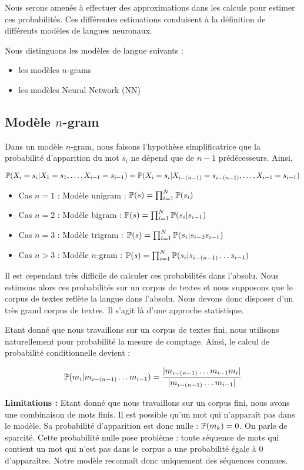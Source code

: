 Nous serons amenés à effectuer des approximations dans les calculs pour estimer ces probabilités. Ces différentes estimations conduisent à la définition de différents modèles de langues neuronaux.

Nous distinguons les modèles de langue suivants :

\begin{itemize}
  \item les modèles $n$-grams
  \item les modèles Neural Network (NN)
\end{itemize}

\subsection{Modèle $n$-gram}
Dans un modèle $n$-gram, nous faisons l'hypothèse simplificatrice que la probabilité d'apparition du mot $s_i$ ne dépend que de $n-1$ prédécesseurs. Ainsi,

\[ \P(X_i=s_i \vert X_1=s_1,\ldots, X_{i-1}=s_{i-1}) = \P(X_i=s_i \vert X_{i-(n-1)}=s_{i-(n-1)},\ldots, X_{i-1}=s_{i-1}) \]

\begin{itemize}
  \item Cas $n=1$ : Modèle unigram : $\P(s) = \prod_{i=1}^N \P(s_i)$
  \item Cas $n=2$ : Modèle bigram : $\P(s) = \prod_{i=1}^N \P(s_i\vert s_{i-1})$
  \item Cas $n=3$ : Modèle trigram : $\P(s) = \prod_{i=1}^N \P(s_i\vert s_{i-2}s_{i-1})$
  \item Cas $n > 3$ : Modèle $n$-gram : $\P(s) = \prod_{i=1}^N \P(s_i\vert s_{i-(n-1)}\ldots s_{i-1})$
\end{itemize}

Il est cependant très difficile de calculer ces probabilités dans l'absolu. 
Nous estimons alors ces probabilités sur un corpus de textes et nous supposons que le corpus de textes reflète la langue dans l'absolu.
Nous devons donc disposer d'un très grand corpus de textes. Il s'agit là d'une approche statistique.

Etant donné que nous travaillons sur un corpus de textes fini, nous utilisons naturellement pour probabilité la mesure de comptage. Ainsi, le calcul de probabilité conditionnelle devient :

\[ \P(m_i\vert m_{i-(n-1)}\ldots m_{i-1}) = \frac{\vert m_{i-(n-1)}\ldots m_{i-1}m_i\vert}{\vert m_{i-(n-1)}\ldots m_{i-1}\vert} \]

\textbf{Limitations :} Etant donné que nous travaillons sur un corpus fini, nous avons une combinaison de mots finis. Il est possible qu'un mot qui n'apparaît pas dans le modèle. Sa probabilité d'apparition est donc nulle : $\P(m_k) = 0$. On parle de sparcité. Cette probabilité nulle pose problème : toute séquence de mots qui contient un mot qui n'est pas dans le corpus a une probabilité égale à 0 d'apparaître.
Notre modèle reconnaît donc uniquement des séquences connues.

